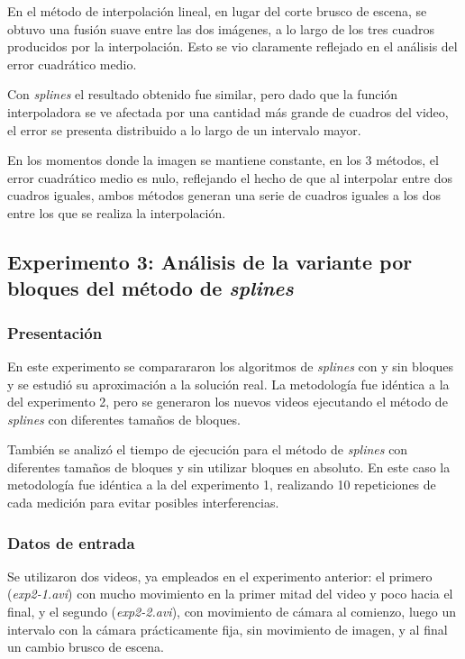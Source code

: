             En el método de interpolación lineal, en lugar del corte brusco de escena, se obtuvo una fusión suave entre las dos imágenes, a lo largo de los tres cuadros producidos por la interpolación. Esto se vio claramente reflejado en el análisis del error cuadrático medio.

            Con \emph{splines} el resultado obtenido fue similar, pero dado que la función interpoladora se ve afectada por una cantidad más grande de cuadros del video, el error se presenta distribuido a lo largo de un intervalo mayor.

            En los momentos donde la imagen se mantiene constante, en los 3 métodos, el error cuadrático medio es nulo, reflejando el hecho de que al interpolar entre dos cuadros iguales, ambos métodos generan una serie de cuadros iguales a los dos entre los que se realiza la interpolación.

    \subsection{Experimento 3: Análisis de la variante por bloques del método de \emph{splines}}

        \subsubsection*{Presentación}

            En este experimento se comparararon los algoritmos de \emph{splines} con y sin bloques y se estudió su aproximación a la solución real. La metodología fue idéntica a la del experimento 2, pero se generaron los nuevos videos ejecutando el método de \emph{splines} con diferentes tamaños de bloques.

            También se analizó el tiempo de ejecución para el método de \emph{splines} con diferentes tamaños de bloques y sin utilizar bloques en absoluto. En este caso la metodología fue idéntica a la del experimento 1, realizando 10 repeticiones de cada medición para evitar posibles interferencias.

            \subsubsection*{Datos de entrada}

            Se utilizaron dos videos, ya empleados en el experimento anterior: el primero (\emph{exp2-1.avi}) con mucho movimiento en la primer mitad del video y poco hacia el final, y el segundo (\emph{exp2-2.avi}), con movimiento de cámara al comienzo, luego un intervalo con la cámara prácticamente fija, sin movimiento de imagen, y al final un cambio brusco de escena.

